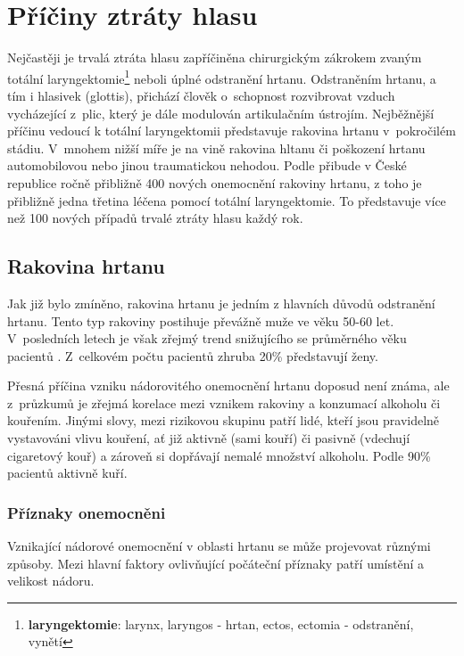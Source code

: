 \section{Příčiny ztráty hlasu}
\label{sec:cause:desease}

Nejčastěji je trvalá ztráta hlasu zapříčiněna chirurgickým zákrokem zvaným
totální laryngektomie\footnote{\textbf{laryngektomie}: larynx, laryngos -
hrtan, ectos, ectomia - odstranění, vynětí} neboli úplné odstranění hrtanu.
Odstraněním hrtanu, a tím i hlasivek (glottis), přichází člověk o~schopnost
rozvibrovat vzduch vycházející z~plic, který je dále modulován artikulačním
ústrojím. Nejběžnější příčinu vedoucí k totální laryngektomii představuje
rakovina hrtanu v~pokročilém stádiu. V~mnohem nižší míře je na vině rakovina
hltanu či poškození hrtanu automobilovou nebo jinou traumatickou nehodou.
Podle \cite{Slavicek2000} přibude v České republice ročně přibližně 400 nových
onemocnění rakoviny hrtanu, z toho je přibližně jedna třetina léčena pomocí
totální laryngektomie. To představuje více než 100 nových případů trvalé
ztráty hlasu každý rok.

\subsection{Rakovina hrtanu} %
\label{sub:cause:desease:cancer}

Jak již bylo zmíněno, rakovina hrtanu je jedním z hlavních důvodů odstranění
hrtanu. Tento typ rakoviny postihuje převážně muže ve věku 50-60 let.
V~posledních letech je však zřejmý trend snižujícího se průměrného věku
pacientů \cite{Skvrnakova2010}. Z~celkovém počtu pacientů zhruba 20\%
představují ženy.

Přesná příčina vzniku nádorovitého onemocnění hrtanu doposud není známa, ale
z~průzkumů je zřejmá korelace mezi vznikem rakoviny a konzumací alkoholu či
kouřením. Jinými slovy, mezi rizikovou skupinu patří lidé, kteří jsou
pravidelně vystavováni vlivu kouření, ať již aktivně (sami kouří) či pasivně
(vdechují cigaretový kouř) a zároveň si dopřávají nemalé množství alkoholu.
Podle \cite{Skvrnakova2010} 90\% pacientů aktivně kuří.

\subsubsection{Příznaky onemocněni} %
\label{ssub:cause:desease:cancer:symptom}

Vznikající nádorové onemocnění v oblasti hrtanu se může projevovat různými
způsoby. Mezi hlavní faktory ovlivňující počáteční příznaky patří umístění a
velikost nádoru.

